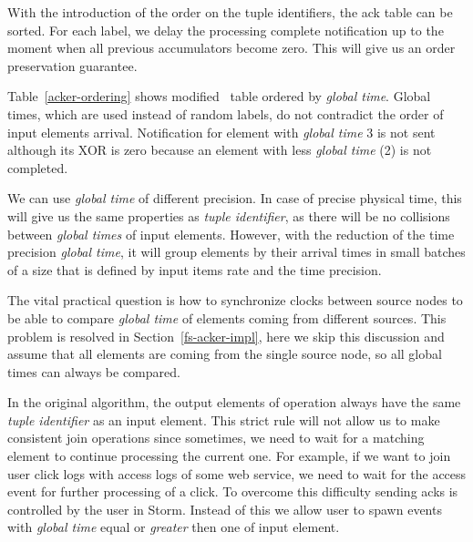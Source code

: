 With the introduction of the order on the tuple identifiers, the ack table can be sorted. For each label, we delay the processing complete notification up to the moment when all previous accumulators become zero. This will give us an order preservation guarantee.

Table~\ref{acker-ordering} shows modified \acker\ table ordered by \textit{global time}. Global times, which are used instead of random labels, do not contradict the order of input elements arrival. Notification for element with \textit{global time} 3 is not sent although its XOR is zero because an element with less \textit{global time} (2) is not completed.


We can use \textit{global time} of different precision. In case of precise physical time, this will give us the same properties as \textit{tuple identifier}, as there will be no collisions between \textit{global times} of input elements. However, with the reduction of the time precision \textit{global time}, it will group elements by their arrival times in small batches of a size that is defined by input items rate and the time precision.

The vital practical question is how to synchronize clocks between source nodes to be able to compare \textit{global time} of elements coming from different sources. This problem is resolved in Section~\ref{fs-acker-impl}, here we skip this discussion and assume that all elements are coming from the single source node, so all global times can always be compared.

In the original algorithm, the output elements of operation always have the same \textit{tuple identifier} as an input element. This strict rule will not allow us to make consistent join operations since sometimes, we need to wait for a matching element to continue processing the current one. For example, if we want to join user click logs with access logs of some web service, we need to wait for the access event for further processing of a click. To overcome this difficulty sending acks is controlled by the user in Storm. Instead of this we allow user to spawn events with \textit{global time} equal or \textit{greater} then one of input element.


